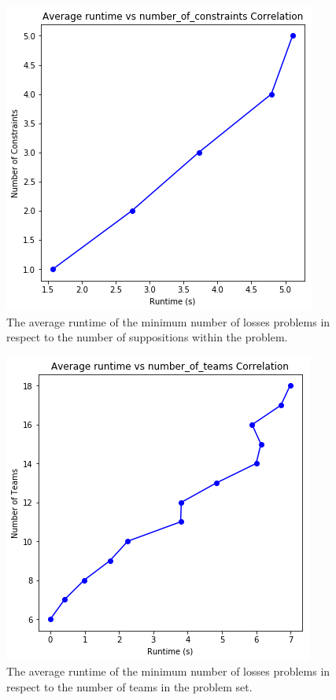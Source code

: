 \documentclass{article}
\begin{document}
	\begin{figure}
		\centering
		\includegraphics[width=0.7\linewidth]{graphs/LR/mnl-num_const-LR}
		\caption{The average runtime of the minimum number of losses problems in respect to the number of suppositions within the problem.}
		\label{fig:mnl-num_const-lr}
	\end{figure}
	\begin{figure}
		\centering
		\includegraphics[width=0.7\linewidth]{graphs/LR/mnl-num_teams_LR}
		\caption{The average runtime of the minimum number of losses problems in respect to the number of teams in the problem set.}
		\label{fig:mnl-num_teams_lr}
	\end{figure}
\end{document}
